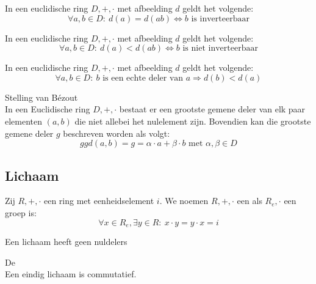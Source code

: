 \documentclass[main.tex]{subfiles}
\begin{document}
\begin{st}
  In een euclidische ring $D,+,\cdot$ met afbeelding $d$ geldt het volgende:
  \[ \forall a,b \in D:\ d(a) = d(ab) \Leftrightarrow b \text{ is inverteerbaar} \]
\end{st}

\begin{st}
  In een euclidische ring $D,+,\cdot$ met afbeelding $d$ geldt het volgende:
  \[ \forall a,b \in D:\ d(a) < d(ab) \Leftrightarrow b \text{ is niet inverteerbaar} \]
\end{st}

\begin{st}
  In een euclidische ring $D,+,\cdot$ met afbeelding $d$ geldt het volgende:
  \[ \forall a,b \in D:\ b \text{ is een echte deler van } a \Rightarrow d(b) < d(a) \]
\end{st}

\begin{st}
  Stelling van B\'ezout\\
  In een Euclidische ring $D,+,\cdot$ bestaat er een grootste gemene deler van elk paar elementen $(a,b)$ die niet allebei het nulelement zijn.
  Bovendien kan die grootste gemene deler $g$ beschreven worden als volgt:
  \[ ggd(a,b) = g = \alpha \cdot a + \beta \cdot b \text{ met }\alpha,\beta \in D \]
\end{st}


\subsection{Lichaam}
\label{sec:lichaam}

\begin{de}
  Zij $R,+,\cdot$ een ring met eenheidselement $i$.
  We noemen $R,+,\cdot$ een  als $R_{e},\cdot$ een groep is:
  \[ \forall x \in R_{e}, \exists y \in R:\ x\cdot y = y \cdot x = i \]
\end{de}

\begin{st}
  Een lichaam heeft geen nuldelers
\end{st}

\begin{st}
  \label{st:stelling-van-wedderburn}
  De \\
  Een eindig lichaam is commutatief.
\end{st}
\end{document}
